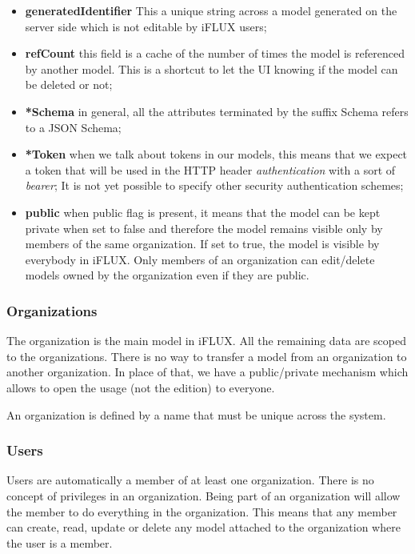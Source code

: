 \begin{itemize}
\item \textbf{generatedIdentifier} This a unique string across a model generated on the server side which is not editable by iFLUX users;
\item \textbf{refCount} this field is a cache of the number of times the model is referenced by another model. This is a shortcut to let the UI knowing if the model can be deleted or not;
\item \textbf{*Schema} in general, all the attributes terminated by the suffix Schema refers to a JSON Schema;
\item \textbf{*Token} when we talk about tokens in our models, this means that we expect a token that will be used in the HTTP header \emph{authentication} with a sort of \emph{bearer}; It is not yet possible to specify other security authentication schemes;
\item \textbf{public} when public flag is present, it means that the model can be kept private when set to false and therefore the model remains visible only by members of the same organization. If set to true, the model is visible by everybody in iFLUX. Only members of an organization can edit/delete models owned by the organization even if they are public.
\end{itemize}

\subsubsection{Organizations}

The organization is the main model in iFLUX. All the remaining data are scoped to the organizations. There is no way to transfer a model from an organization to another organization. In place of that, we have a public/private mechanism which allows to open the usage (not the edition) to everyone.

An organization is defined by a name that must be unique across the system.

\subsubsection{Users}

Users are automatically a member of at least one organization. There is no concept of privileges in an organization. Being part of an organization will allow the member to do everything in the organization. This means that any member can create, read, update or delete any model attached to the organization where the user is a member.

